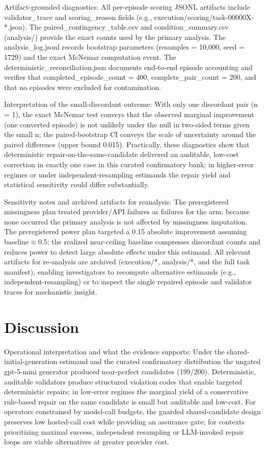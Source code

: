 \documentclass[conference]{IEEEtran}
\begin{document}
Artifact-grounded diagnostics: All per-episode scoring JSONL artifacts include validator\_trace and scoring\_reason fields (e.g., execution/scoring/task-00000X-*.json). The paired\_contingency\_table.csv and condition\_summary.csv (analysis/) provide the exact counts used by the primary analysis. The analysis\_log.jsonl records bootstrap parameters (resamples = 10,000, seed = 1729) and the exact McNemar computation event. The deterministic\_reconciliation.json documents end-to-end episode accounting and verifies that completed\_episode\_count = 400, complete\_pair\_count = 200, and that no episodes were excluded for contamination.

Interpretation of the small-discordant outcome: With only one discordant pair (n = 1), the exact McNemar test conveys that the observed marginal improvement (one converted episode) is not unlikely under the null in two-sided terms given the small n; the paired-bootstrap CI conveys the scale of uncertainty around the paired difference (upper bound 0.015). Practically, these diagnostics show that deterministic repair-on-the-same-candidate delivered an auditable, low-cost correction in exactly one case in this curated confirmatory bank; in higher-error regimes or under independent-resampling estimands the repair yield and statistical sensitivity could differ substantially.

Sensitivity notes and archived artifacts for reanalysis: The preregistered missingness plan treated provider/API failures as failures for the arm; because none occurred the primary analysis is not affected by missingness imputation. The preregistered power plan targeted a 0.15 absolute improvement assuming baseline\ensuremath{\approx}0.5; the realized near-ceiling baseline compresses discordant counts and reduces power to detect large absolute effects under this estimand. All relevant artifacts for re-analysis are archived (execution/*, analysis/*, and the full task manifest), enabling investigators to recompute alternative estimands (e.g., independent-resampling) or to inspect the single repaired episode and validator traces for mechanistic insight.

\section{Discussion}
Operational interpretation and what the evidence supports: Under the shared-initial-generation estimand and the curated confirmatory distribution the ungated gpt-5-mini generator produced near-perfect candidates (199/200). Deterministic, auditable validators produce structured violation codes that enable targeted deterministic repairs; in low-error regimes the marginal yield of a conservative rule-based repair on the same candidate is small but auditable and low-cost. For operators constrained by model-call budgets, the guarded shared-candidate design preserves low hosted-call cost while providing an assurance gate; for contexts prioritizing maximal success, independent resampling or LLM-invoked repair loops are viable alternatives at greater provider cost.
\end{document}
